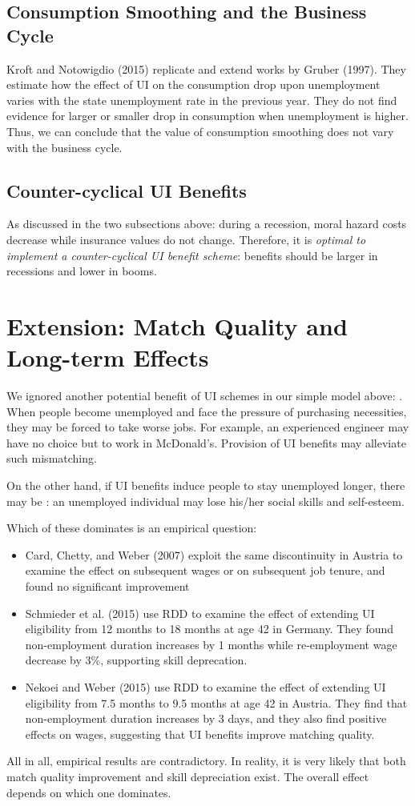     \subsection{Consumption Smoothing and the Business Cycle}
    Kroft and Notowigdio (2015) replicate and extend works by Gruber (1997). They estimate how the effect of UI on the consumption drop upon unemployment varies with the state unemployment rate in the previous year. They do not find evidence for larger or smaller drop in consumption when unemployment is higher. Thus, we can conclude that the value of consumption smoothing does not vary with the business cycle.
    
    \subsection{Counter-cyclical UI Benefits}
    As discussed in the two subsections above: during a recession, moral hazard costs decrease while insurance values do not change. Therefore, it is \emph{optimal to implement a counter-cyclical UI benefit scheme}: benefits should be larger in recessions and lower in booms.
    
\section{Extension: Match Quality and Long-term Effects}
    We ignored another potential benefit of UI schemes in our simple model above: . When people become unemployed and face the pressure of purchasing necessities, they may be forced to take worse jobs. For example, an experienced engineer may have no choice but to work in McDonald's. Provision of UI benefits may alleviate such mismatching.
    
    On the other hand, if UI benefits induce people to stay unemployed longer, there may be : an unemployed individual may lose his/her social skills and self-esteem.
    
    Which of these dominates is an empirical question:
    \begin{itemize}
        \item Card, Chetty, and Weber (2007) exploit the same discontinuity in Austria to examine the effect on subsequent wages or on subsequent job tenure, and found no significant improvement
        \item Schmieder et al. (2015) use RDD to examine the effect of extending UI eligibility from 12 months to 18 months at age 42 in Germany. They found non-employment duration increases by 1 months while re-employment wage decrease by 3\%, supporting skill deprecation.
        \item Nekoei and Weber (2015) use RDD to examine the effect of extending UI eligibility from 7.5 months to 9.5 months at age 42 in Austria. They find that non-employment duration increases by 3 days, and they also find positive effects on wages, suggesting that UI benefits improve matching quality.
    \end{itemize}
    
    All in all, empirical results are contradictory. In reality, it is very likely that both match quality improvement and skill depreciation exist. The overall effect depends on which one dominates.